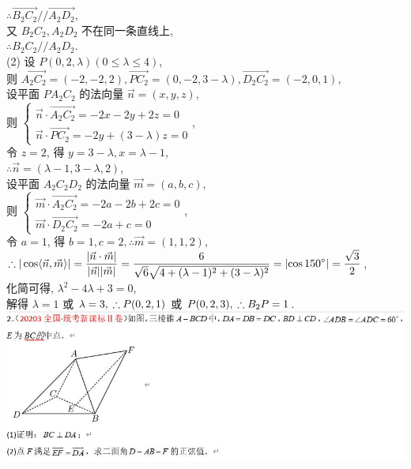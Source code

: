\documentclass[a4paper,11pt,UTF8]{article}
\begin{document}
$\therefore \overrightarrow{B_2 C_2} / / \overrightarrow{A_2 D_2}$,\\
又 $B_2 C_2, A_2 D_2$ 不在同一条直线上,\\
$\therefore B_2 C_2 / / A_2 D_2$.\\
(2) 设 $P(0,2, \lambda)(0 \leq \lambda \leq 4)$,\\
则 $\overrightarrow{A_2 C_2}=(-2,-2,2), \overrightarrow{P C_2}=(0,-2,3-\lambda), \overrightarrow{D_2 C_2}=(-2,0,1)$,\\
设平面 $P A_2 C_2$ 的法向量 $\vec{n}=(x, y, z)$,\\
则 $\left\{\begin{array}{l}\vec{n} \cdot \overrightarrow{A_2 C_2}=-2 x-2 y+2 z=0 \\ \vec{n} \cdot \overrightarrow{P C_2}=-2 y+(3-\lambda) z=0\end{array}\right.$,\\
令 $z=2$, 得 $y=3-\lambda, x=\lambda-1$,\\
$\therefore \vec{n}=(\lambda-1,3-\lambda, 2)$,\\
设平面 $A_2 C_2 D_2$ 的法向量 $\vec{m}=(a, b, c)$,\\
则 $\left\{\begin{array}{l}\vec{m} \cdot \overrightarrow{A_2 C_2}=-2 a-2 b+2 c=0 \\ \vec{m} \cdot \overrightarrow{D_2 C_2}=-2 a+c=0\end{array}\right.$,\\
令 $a=1$, 得 $b=1, c=2, \therefore \vec{m}=(1,1,2)$,\\
$\displaystyle\therefore|\cos \langle\vec{n}, \vec{m}\rangle|=\frac{|\vec{n} \cdot\\ \vec{m}|}{|\vec{n}||\vec{m}|}=\frac{6}{\sqrt{6}\\ \sqrt{4+(\lambda-1)^2+(3-\lambda)^2}}=\left|\cos 150^{\circ}\right|=\frac{\sqrt{3}}{2}$,\\
化简可得, $\lambda^2-4 \lambda+3=0$,\\
解得 $\lambda=1$ 或 $\lambda=3, \\\therefore P(0,2,1)$ 或 $P(0,2,3),  \\\therefore B_2 P=1$.\\
\includegraphics[scale=0.8]{./2023_new2.jpg}\\
\end{document}
